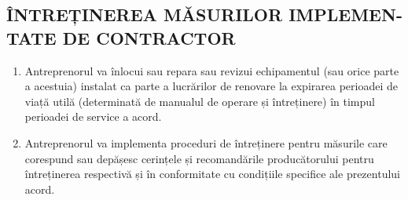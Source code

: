 \begin{multicols}{2}
\subsection{ÎNTREȚINEREA MĂSURILOR IMPLEMEN-TATE DE CONTRACTOR}
\begin{enumerate}
\item Antreprenorul va înlocui sau repara sau revizui echipamentul (sau orice parte a acestuia) instalat ca parte a lucrărilor de renovare la expirarea perioadei de viață utilă (determinată de manualul de operare și întreținere) în timpul perioadei de service a acord.
\item Antreprenorul va implementa proceduri de întreținere pentru măsurile care corespund sau depășesc cerințele și recomandările producătorului pentru întreținerea respectivă și în conformitate cu condițiile specifice ale prezentului acord.
\end{enumerate}


\end{multicols}

